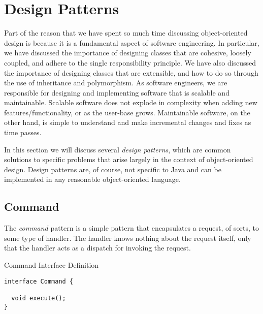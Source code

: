 \section{Design Patterns}

Part of the reason that we have spent so much time discussing object-oriented design is because it is a fundamental aspect of software engineering. In particular, we have discussed the importance of designing classes that are cohesive, loosely coupled, and adhere to the single responsibility principle. We have also discussed the importance of designing classes that are extensible, and how to do so through the use of inheritance and polymorphism. As software engineers, we are responsible for designing and implementing software that is scalable and maintainable. Scalable software does not explode in complexity when adding new features/functionality, or as the user-base grows. Maintainable software, on the other hand, is simple to understand and make incremental changes and fixes as time passes. 

In this section we will discuss several \textit{design patterns}, which are common solutions to specific problems that arise largely in the context of object-oriented design. Design patterns are, of course, not specific to Java and can be implemented in any reasonable object-oriented language. 

\subsection*{Command}

The \textit{command} pattern is a simple pattern that encapsulates a request, of sorts, to some type of handler. The handler knows nothing about the request itself, only that the handler acts as a dispatch for invoking the request.


\begin{cl}{Command Interface Definition}
\begin{lstlisting}[language=MyJava]
interface Command {

  void execute();
}
\end{lstlisting}
\end{cl}

